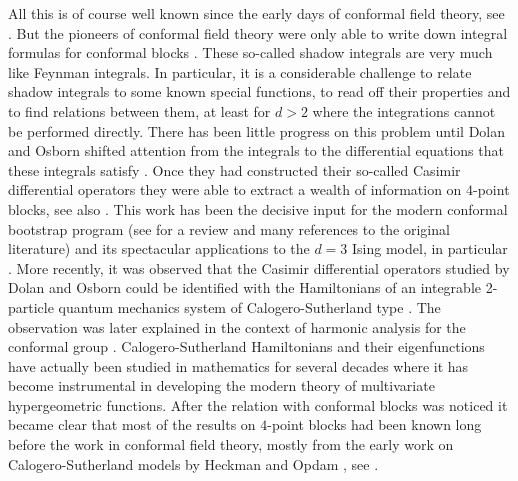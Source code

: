 \documentclass{article}
\begin{document}
All this is of course well known since the early days of conformal field theory, see 
\cite{Ferrara:1973vz,Ferrara:1973yt,Mack:1976pa}. But the pioneers of conformal field 
theory were only able to write down integral formulas for conformal blocks 
\cite{Ferrara:1972uq,Dobrev:1977qv}. These so-called shadow integrals are very 
much like Feynman integrals. In particular, it is a considerable challenge to 
relate shadow integrals to some known special functions, to read off their properties 
and to find relations between them, at least for $d > 2$ where the integrations cannot 
be performed directly. There has been little progress on this problem until 
Dolan and Osborn shifted attention from the integrals to the differential equations that these integrals satisfy \cite{Dolan:2000ut,Dolan:2003hv}. Once they had constructed 
their so-called Casimir differential operators they were able to extract a wealth of 
information on $4$-point blocks, see also \cite{Dolan:2011dv,Hogervorst:2013sma,Penedones:2015aga}. 
This work has been the decisive input for the modern conformal 
bootstrap program (see \cite{Poland:2018epd} for a review and many references to the original 
literature) and its spectacular applications to the $d=3$ Ising model, in particular 
\cite{ElShowk:2012ht,El-Showk:2014dwa,Kos:2016ysd,Simmons-Duffin:2016wlq}. More 
recently, it was observed that the Casimir differential 
operators studied by Dolan and Osborn could be identified with the Hamiltonians of 
an integrable 2-particle quantum mechanics system of Calogero-Sutherland type 
\cite{Isachenkov:2016gim}. The observation was later explained in the context of 
harmonic analysis for the conformal group \cite{Schomerus:2016epl,Schomerus:2017eny,
Buric:2019rms,Buric:2020buk}. Calogero-Sutherland Hamiltonians and their eigenfunctions 
have actually been studied in mathematics for several decades where it has become 
instrumental in developing the modern theory of multivariate hypergeometric functions. After 
the relation with conformal blocks was noticed it became clear that most of the 
results on $4$-point blocks had been known long before the work in conformal field 
theory, mostly from the early work on Calogero-Sutherland models by Heckman and Opdam 
\cite{Heckman-Opdam}, see \cite{Isachenkov:2017qgn}. 
\end{document}
